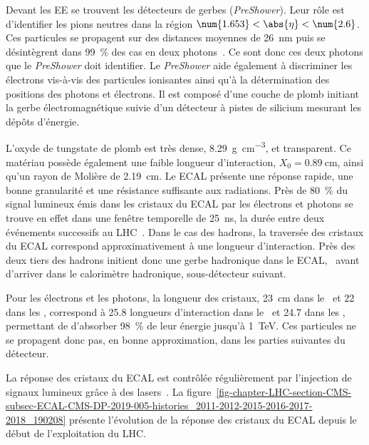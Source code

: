 \par Devant les EE se trouvent les détecteurs de gerbes (\emph{PreShower}).
Leur rôle est d'identifier les pions neutres dans la région $\num{1.653}<\abs{\eta}<\num{2.6}$.
Ces particules se propagent sur des distances moyennes de \SI{26}{\nano\meter} puis se désintègrent dans \SI{99}{\%} des cas en deux photons~\cite{PDG_booklet_2020}.
Ce sont donc ces deux photons que le \emph{PreShower} doit identifier.
Le \emph{PreShower} aide également à discriminer les électrons vis-à-vis des particules ionisantes ainsi qu'à la détermination des positions des photons et électrons.
Il est composé d'une couche de plomb initiant la gerbe électromagnétique suivie d'un détecteur à pistes de silicium mesurant les dépôts d'énergie.
\par L'oxyde de tungstate de plomb est très dense, \SI{8.29}{\gram.\centi\meter^{-3}}, et transparent.
Ce matériau possède également une faible longueur d'interaction, $X_0=\SI{0.89}{\centi\meter}$, ainsi qu'un rayon de Molière de \SI{2.19}{\centi\meter}.
Le ECAL présente une réponse rapide, une bonne granularité et une résistance suffisante aux radiations.
Près de \SI{80}{\%} du signal lumineux émis dans les cristaux du ECAL par les électrons et photons se trouve en effet dans une fenêtre temporelle de \SI{25}{\nano\second}, la durée entre deux événements successifs au LHC~\cite{cms_paper}.
Dans le cas des hadrons, la traversée des cristaux du ECAL correspond approximativement à une longueur d'interaction.
Près des deux tiers des hadrons initient donc une gerbe hadronique dans le ECAL, \ie\ avant d'arriver dans le calorimètre hadronique, sous-détecteur suivant.
\par Pour les électrons et les photons, la longueur des cristaux, \SI{23}{\centi\meter} dans le \CMSbarrel\ et \num{22} dans les \CMSendcaps, correspond à \num{25.8} longueurs d'interaction dans le \CMSbarrel\ et \num{24.7} dans les \CMSendcaps, permettant de d'absorber \SI{98}{\%} de leur énergie jusqu'à \SI{1}{\TeV}.
Ces particules ne se propagent donc pas, en bonne approximation, dans les parties suivantes du détecteur.
\par La réponse des cristaux du ECAL est contrôlée régulièrement par l'injection de signaux lumineux grâce à des lasers~\cite{CMS-DP-2019-005}.
La figure~\ref{fig-chapter-LHC-section-CMS-subsec-ECAL-CMS-DP-2019-005-histories_2011-2012-2015-2016-2017-2018_190208} présente l'évolution de la réponse des cristaux du ECAL depuis le début de l'exploitation du LHC.
